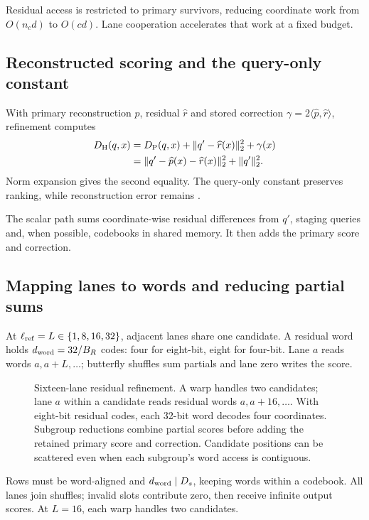 Residual access is restricted to primary survivors, reducing coordinate
work from $O(n_cd)$ to $O(cd)$. Lane cooperation accelerates that work
at a fixed budget.

\subsection{Reconstructed scoring and the query-only constant}

With primary reconstruction $\widehat p$, residual $\widehat r$ and stored correction $\gamma=2\langle\widehat p,\widehat r\rangle$, refinement computes
\begin{align}
 D_{\mathrm{H}}(q,x)
 &=D_{\mathrm{P}}(q,x)+\|q'-\widehat r(x)\|_2^2+\gamma(x)
 \label{eq:5-refined-score}\\
 &=\|q'-\widehat p(x)-\widehat r(x)\|_2^2+\|q'\|_2^2.
 \label{eq:5-refined-constant}
\end{align}
Norm expansion gives the second equality. The query-only constant preserves ranking, while reconstruction error remains \cite{jhq}.

The scalar path sums coordinate-wise residual differences from $q'$, staging queries and, when possible, codebooks in shared memory. It then adds the primary score and correction.

\subsection{Mapping lanes to words and reducing partial sums}

At $\ell_{\mathrm{ref}}=L\in\{1,8,16,32\}$, adjacent lanes share one candidate. A residual word holds $d_{\rm word}=32/B_R$ codes: four for eight-bit, eight for four-bit. Lane $a$ reads words $a,a+L,\ldots$; butterfly shuffles sum partials and lane zero writes the score.

\begin{figure}[tbp]
\centering

\caption[Sixteen-lane residual refinement]{Sixteen-lane residual refinement. A warp handles two candidates;
lane $a$ within a candidate reads residual words $a,a+16,\ldots$.
With eight-bit residual codes, each 32-bit word decodes four coordinates.
Subgroup reductions combine
partial scores before adding the retained primary score and correction.
Candidate positions can be scattered even when each subgroup's word
access is contiguous.}
\label{fig:5-lane-refinement}
\end{figure}

Rows must be word-aligned and $d_{\rm word}\mid D_s$, keeping words within a codebook. All lanes join shuffles; invalid slots contribute zero, then receive infinite output scores. At $L=16$, each warp handles two candidates.

